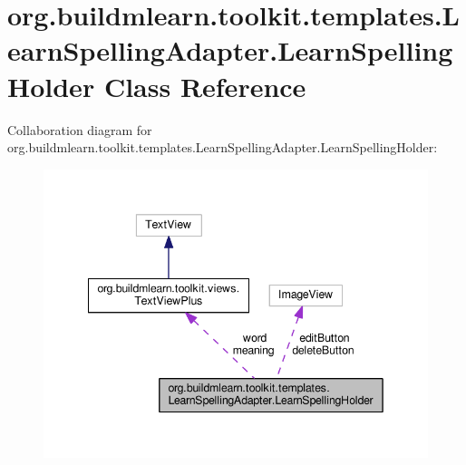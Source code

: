 \hypertarget{classorg_1_1buildmlearn_1_1toolkit_1_1templates_1_1LearnSpellingAdapter_1_1LearnSpellingHolder}{}\section{org.\+buildmlearn.\+toolkit.\+templates.\+Learn\+Spelling\+Adapter.\+Learn\+Spelling\+Holder Class Reference}
\label{classorg_1_1buildmlearn_1_1toolkit_1_1templates_1_1LearnSpellingAdapter_1_1LearnSpellingHolder}


Collaboration diagram for org.\+buildmlearn.\+toolkit.\+templates.\+Learn\+Spelling\+Adapter.\+Learn\+Spelling\+Holder\+:
\nopagebreak
\begin{figure}[H]
\begin{center}
\leavevmode
\includegraphics[width=342pt]{classorg_1_1buildmlearn_1_1toolkit_1_1templates_1_1LearnSpellingAdapter_1_1LearnSpellingHolder__coll__graph}
\end{center}
\end{figure}
